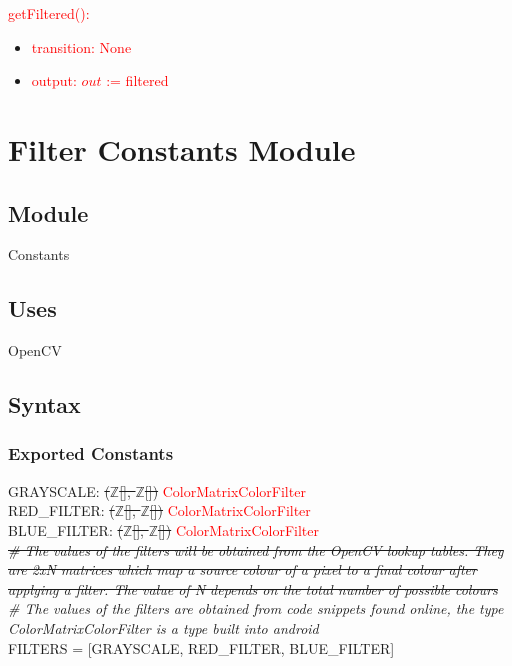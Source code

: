 \documentclass[12pt, titlepage]{article}
\begin{document}
\noindent \textcolor{red}{getFiltered():}
\begin{itemize}
\item \textcolor{red}{transition: None}
\item \textcolor{red}{output: $out$ := filtered}
\end{itemize}

\newpage

\section* {Filter Constants Module}

\subsection*{Module}

Constants

\subsection* {Uses}

OpenCV

\subsection* {Syntax}

\subsubsection* {Exported Constants}

GRAYSCALE: \sout{($\mathbb{Z}$[], $\mathbb{Z}$[])} \textcolor{red}{ColorMatrixColorFilter}\\
RED\_FILTER: \sout{($\mathbb{Z}$[], $\mathbb{Z}$[])} \textcolor{red}{ColorMatrixColorFilter} \\
BLUE\_FILTER: \sout{($\mathbb{Z}$[], $\mathbb{Z}$[])} \textcolor{red}{ColorMatrixColorFilter}\\
\sout{\textit{\# The values of the filters will be obtained from the OpenCV lookup tables. They are 2xN matrices which map a source colour of a pixel to a final colour after applying a filter. The value of N depends on the total number of possible colours}}\\
\textit{\# The values of the filters are obtained from code snippets found online, 
the type ColorMatrixColorFilter is a type built into android}\\
FILTERS = [GRAYSCALE, RED\_FILTER, BLUE\_FILTER]\\
\end{document}
